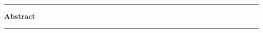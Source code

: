 \begin{center}
\begin{minipage}{0.86\textwidth}
\rule{\linewidth}{0.4pt}\vspace{3pt}

{\centering\textbf{\large Abstract}\par}\vspace{4pt}
\small


\vspace{4pt}\rule{\linewidth}{0.4pt}
\end{minipage}
\end{center}
